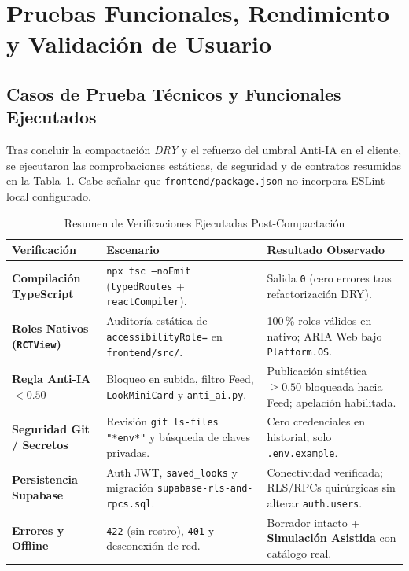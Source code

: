 \documentclass[conference]{IEEEtran}
\begin{document}
\section{Pruebas Funcionales, Rendimiento y Validación de Usuario}

\subsection{Casos de Prueba Técnicos y Funcionales Ejecutados}
Tras concluir la compactación \textit{DRY} y el refuerzo del umbral Anti-IA en el cliente, se ejecutaron las comprobaciones estáticas, de seguridad y de contratos resumidas en la Tabla~\ref{tab:pruebas}. Cabe señalar que \texttt{frontend/package.json} no incorpora ESLint local configurado.

\begin{table}[t]
\centering
\caption{Resumen de Verificaciones Ejecutadas Post-Compactación}
\label{tab:pruebas}
\renewcommand{\arraystretch}{1.15}
\scriptsize
\begin{tabularx}{\columnwidth}{>{\bfseries}p{2.2cm} p{2.9cm} X}
\toprule
Verificación & Escenario & Resultado Observado \\
\midrule
Compilación TypeScript & \texttt{npx tsc --noEmit} (\texttt{typedRoutes} + \texttt{reactCompiler}). & Salida \texttt{0} (cero errores tras refactorización DRY). \\
Roles Nativos (\texttt{RCTView}) & Auditoría estática de \texttt{accessibilityRole=} en \texttt{frontend/src/}. & 100\,\% roles válidos en nativo; ARIA Web bajo \texttt{Platform.OS}. \\
Regla Anti-IA $< 0.50$ & Bloqueo en subida, filtro Feed, \texttt{LookMiniCard} y \texttt{anti\_ai.py}. & Publicación sintética $\ge 0.50$ bloqueada hacia Feed; apelación habilitada. \\
Seguridad Git / Secretos & Revisión \texttt{git ls-files "*env*"} y búsqueda de claves privadas. & Cero credenciales en historial; solo \texttt{.env.example}. \\
Persistencia Supabase & Auth JWT, \texttt{saved\_looks} y migración \texttt{supabase-rls-and-rpcs.sql}. & Conectividad verificada; RLS/RPCs quirúrgicas sin alterar \texttt{auth.users}. \\
Errores y Offline & \texttt{422} (sin rostro), \texttt{401} y desconexión de red. & Borrador intacto + \textbf{Simulación Asistida} con catálogo real. \\
\bottomrule
\end{tabularx}
\end{table}
\end{document}
